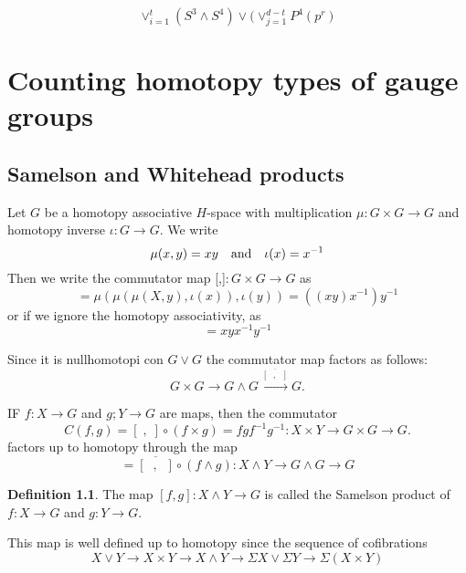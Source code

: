 \documentclass[A4,11pt,oneside]{book}
\theoremstyle{definition}
\newtheorem{defi}{Definition}
\begin{document}
\begin{equation}
\vee_{i=1}^t (S^3\wedge S^4)\vee(\vee_{j=1}^{d-t} P^4(p^r) 
\end{equation}

\chapter{Counting homotopy types of gauge groups}

\section{Samelson and Whitehead products}

Let $G$ be a homotopy associative $H$-space with multiplication $\mu:G\times G\rightarrow G$ and homotopy inverse $\iota:G\rightarrow G$. We write 
\begin{equation*}
\mu(x,y)=xy\quad {\rm{and}}\quad\iota(x)=x^{-1}
\end{equation*}
Then we write the commutator map [\;,\;]$:G\times G\rightarrow G$ as
\begin{equation*}
[x,y]=\mu(\mu(\mu(X,y),\iota(x)),\iota(y))=((xy)x^{-1})y^{-1}
\end{equation*}
or if we ignore the homotopy associativity, as
\begin{equation*}
[x,y]=xyx^{-1}y^{-1}
\end{equation*}

Since it is nullhomotopi con $G\vee G$ the commutator map factors as follows:
\begin{equation*}
G\times G\rightarrow G\wedge G\overset{\overline{[\;\;,\;\;]}}{\longrightarrow}G.
\end{equation*}

IF $f:X\rightarrow G$ and $g;Y\rightarrow G$ are maps, then the commutator
\begin{equation*}
C(f,g)=[\;,\;]\circ(f\times g)=fgf^{-1}g^{-1}:X\times Y\rightarrow G\times G\rightarrow G.
\end{equation*}
factors up to homotopy through the map
\begin{equation*}
[f,g]=\overline{[\;\;,\;\;]}\circ(f\wedge g):X\wedge Y\rightarrow G\wedge G\rightarrow G
\end{equation*}

\begin{defi} 
The map $[f,g]:X\wedge Y\rightarrow G$ is called the Samelson product of $f:X\rightarrow G$ and $g:Y\rightarrow G$.
\end{defi}
This map is well defined up to homotopy since the sequence of cofibrations 
\begin{equation*}
X\vee Y\rightarrow X\times Y\rightarrow X\wedge Y\rightarrow \Sigma X\vee\Sigma Y\rightarrow \Sigma(X\times Y)
\end{equation*}
\end{document}
